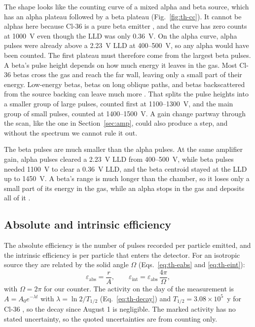 \documentclass[12pt]{article}
\begin{document}
The shape looks like the counting curve of a mixed alpha and beta source, which has an alpha plateau followed by a beta plateau (Fig.~\ref{fig:th-cc}). It cannot be alphas here because Cl-36 is a pure beta emitter \cite{knoll}, and the curve has zero counts at 1000~V even though the LLD was only 0.36~V. On the alpha curve, alpha pulses were already above a 2.23~V LLD at 400--500~V, so any alpha would have been counted. The first plateau must therefore come from the largest beta pulses. A beta's pulse height depends on how much energy it leaves in the gas. Most Cl-36 betas cross the gas and reach the far wall, leaving only a small part of their energy. Low-energy betas, betas on long oblique paths, and betas backscattered from the source backing can leave much more \cite{knoll}. That splits the pulse heights into a smaller group of large pulses, counted first at 1100--1300~V, and the main group of small pulses, counted at 1400--1500~V. A gain change partway through the scan, like the one in Section~\ref{sec:amp}, could also produce a step, and without the spectrum we cannot rule it out.
 
The beta pulses are much smaller than the alpha pulses. At the same amplifier gain, alpha pulses cleared a 2.23~V LLD from 400--500~V, while beta pulses needed 1100~V to clear a 0.36~V LLD, and the beta centroid stayed at the LLD up to 1450~V. A beta's range is much longer than the chamber, so it loses only a small part of its energy in the gas, while an alpha stops in the gas and deposits all of it \cite{knoll}.
 
\subsection{Absolute and intrinsic efficiency}
 
The absolute efficiency is the number of pulses recorded per particle emitted, and the intrinsic efficiency is per particle that enters the detector. For an isotropic source they are related by the solid angle $\Omega$ (Eqs.~\ref{eq:th-eabs} and \ref{eq:th-eint}):
\begin{equation}
\varepsilon_{\text{abs}} = \frac{r}{A}, \qquad \varepsilon_{\text{int}} = \varepsilon_{\text{abs}}\,\frac{4\pi}{\Omega},
\end{equation}
with $\Omega = 2\pi$ for our counter. The activity on the day of the measurement is $A = A_0 e^{-\lambda t}$ with $\lambda = \ln 2/T_{1/2}$ (Eq.~\ref{eq:th-decay}) and $T_{1/2} = 3.08\times10^5$~y for Cl-36 \cite{knoll}, so the decay since August 1 is negligible. The marked activity has no stated uncertainty, so the quoted uncertainties are from counting only.
 
\end{document}
